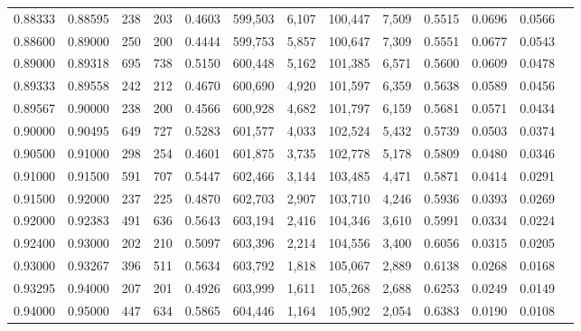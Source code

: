 \begin{tabular}{rrrrrrrrrrrrr}
0.88333 & 0.88595 &   238 & 203 &                                     0.4603 & 599,503 &   6,107 & 100,447 &   7,509 & 0.5515 & 0.0696 & 0.0566 \\
0.88600 & 0.89000 &   250 & 200 &                                     0.4444 & 599,753 &   5,857 & 100,647 &   7,309 & 0.5551 & 0.0677 & 0.0543 \\
0.89000 & 0.89318 &   695 & 738 &                                     0.5150 & 600,448 &   5,162 & 101,385 &   6,571 & 0.5600 & 0.0609 & 0.0478 \\
0.89333 & 0.89558 &   242 & 212 &                                     0.4670 & 600,690 &   4,920 & 101,597 &   6,359 & 0.5638 & 0.0589 & 0.0456 \\
0.89567 & 0.90000 &   238 & 200 &                                     0.4566 & 600,928 &   4,682 & 101,797 &   6,159 & 0.5681 & 0.0571 & 0.0434 \\
0.90000 & 0.90495 &   649 & 727 &                                     0.5283 & 601,577 &   4,033 & 102,524 &   5,432 & 0.5739 & 0.0503 & 0.0374 \\
0.90500 & 0.91000 &   298 & 254 &                                     0.4601 & 601,875 &   3,735 & 102,778 &   5,178 & 0.5809 & 0.0480 & 0.0346 \\
0.91000 & 0.91500 &   591 & 707 &                                     0.5447 & 602,466 &   3,144 & 103,485 &   4,471 & 0.5871 & 0.0414 & 0.0291 \\
0.91500 & 0.92000 &   237 & 225 &                                     0.4870 & 602,703 &   2,907 & 103,710 &   4,246 & 0.5936 & 0.0393 & 0.0269 \\
0.92000 & 0.92383 &   491 & 636 &                                     0.5643 & 603,194 &   2,416 & 104,346 &   3,610 & 0.5991 & 0.0334 & 0.0224 \\
0.92400 & 0.93000 &   202 & 210 &                                     0.5097 & 603,396 &   2,214 & 104,556 &   3,400 & 0.6056 & 0.0315 & 0.0205 \\
0.93000 & 0.93267 &   396 & 511 &                                     0.5634 & 603,792 &   1,818 & 105,067 &   2,889 & 0.6138 & 0.0268 & 0.0168 \\
0.93295 & 0.94000 &   207 & 201 &                                     0.4926 & 603,999 &   1,611 & 105,268 &   2,688 & 0.6253 & 0.0249 & 0.0149 \\
0.94000 & 0.95000 &   447 & 634 &                                     0.5865 & 604,446 &   1,164 & 105,902 &   2,054 & 0.6383 & 0.0190 & 0.0108 \\

\end{tabular}
